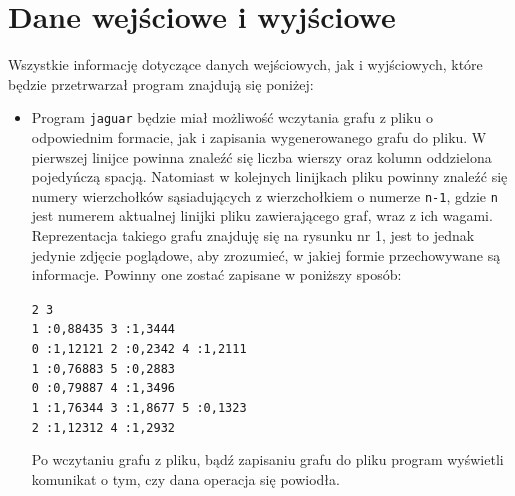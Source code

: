 \documentclass[]{article}
\begin{document}
\section{Dane wejściowe i wyjściowe}\label{header-n233}
Wszystkie informację dotyczące danych wejściowych, jak i wyjściowych, które będzie przetrwarzał program znajdują się poniżej:
\begin{itemize}
\item
Program \texttt{jaguar} będzie miał możliwość wczytania grafu z pliku o odpowiednim formacie, jak i zapisania wygenerowanego grafu do pliku. W pierwszej linijce powinna znaleźć się liczba wierszy oraz kolumn oddzielona pojedyńczą spacją. Natomiast w kolejnych linijkach pliku powinny znaleźć się numery wierzchołków sąsiadujących z wierzchołkiem o numerze \texttt{n-1}, gdzie \texttt{n} jest numerem aktualnej linijki pliku zawierającego graf, wraz z ich wagami. Reprezentacja takiego grafu znajduję się na rysunku nr 1, jest to jednak jedynie zdjęcie poglądowe, aby zrozumieć, w jakiej formie przechowywane są informacje. Powinny one zostać zapisane w poniższy sposób:


\texttt{2 3\\
1 :0,88435  3 :1,3444\\
0 :1,12121  2 :0,2342  4 :1,2111\\
1 :0,76883  5 :0,2883\\
0 :0,79887  4 :1,3496\\
1 :1,76344  3 :1,8677  5 :0,1323\\
2 :1,12312  4 :1,2932}

Po wczytaniu grafu z pliku, bądź zapisaniu grafu do pliku program wyświetli komunikat o tym, czy dana operacja się powiodła. 


\end{itemize}
\end{document}
